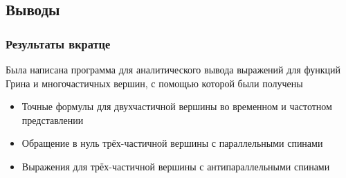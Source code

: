 \documentclass{beamer}
\begin{document}
\subsection{Выводы}
\begin{frame}
 \frametitle{Результаты вкратце}
 \pause
 Была написана программа для аналитического вывода выражений для функций Грина и многочастичных вершин, 
  с помощью которой были получены
 \begin{itemize}
  \item Точные формулы для двухчастичной вершины во временном и частотном представлении \pause
  \item Обращение в нуль трёх-частичной вершины с параллельными спинами \pause
  \item Выражения для трёх-частичной вершины с антипараллельными спинами
 \end{itemize}
\end{frame}
\end{document}
